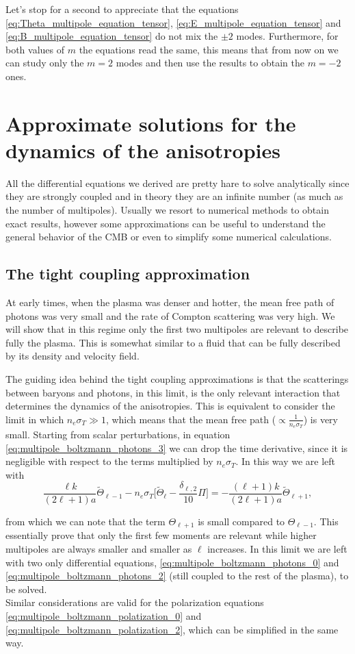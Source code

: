 Let's stop for a second to appreciate that the equations \eqref{eq:Theta_multipole_equation_tensor}, \eqref{eq:E_multipole_equation_tensor} and \eqref{eq:B_multipole_equation_tensor} do not mix the $\pm2$ modes. Furthermore, for both values of $m$ the equations read the same, this means that from now on we can study only the $m=2$ modes and then use the results to obtain the $m=-2$ ones.
\section{Approximate solutions for the dynamics of the anisotropies}\label{sec:CMBApproximations}
All the differential equations we derived are pretty hare to solve analytically since they are strongly coupled and in theory they are an infinite number (as much as the number of multipoles). Usually we resort to numerical methods to obtain exact results, however some approximations can be useful to understand the general behavior of the CMB or even to simplify some numerical calculations.
\subsection{The tight coupling approximation}
\label{sec:TightCouplingApproximation}
At early times, when the plasma was denser and hotter, the mean free path of photons was very small and the rate of Compton scattering was very high. We will show that in this regime only the first two multipoles are  relevant to describe fully the plasma. This is somewhat similar to a fluid that can be fully described by its density and velocity field.

The guiding idea behind the tight coupling approximations is that the scatterings between baryons and photons, in this limit, is the only relevant interaction that determines the dynamics of the anisotropies. This is equivalent to consider the limit in which $n_e\sigma_T\gg1$, which means that the mean free path ($\propto\frac{1}{n_e\sigma_T}$) is very small. Starting from scalar perturbations, in equation \eqref{eq:multipole_boltzmann_photons_3} we can drop the time derivative, since it is negligible with respect to the terms multiplied by $n_e\sigma_T$. In this way we are left with
$$\frac{\ell k}{(2\ell+1)a}\tilde\Theta_{\ell-1}-n_e\sigma_T\bigg[\tilde\Theta_\ell-\frac{\delta_{\ell,2}}{10}\Pi\bigg]=-\frac{(\ell+1)k}{(2\ell+1)a}\tilde\Theta_{\ell+1},$$

from which we can note that the term $\Theta_{\ell+1}$ is small compared to $\Theta_{\ell-1}$. This essentially prove that only the first few moments are relevant while higher multipoles are always smaller and smaller as $\ell$ increases. In this limit we are left with two only differential equations, \eqref{eq:multipole_boltzmann_photons_0} and \eqref{eq:multipole_boltzmann_photons_2} (still coupled to the rest of the plasma), to be solved.\\ Similar considerations are valid for the polarization equations \eqref{eq:multipole_boltzmann_polatization_0} and \eqref{eq:multipole_boltzmann_polatization_2}, which can be simplified in the same way.

